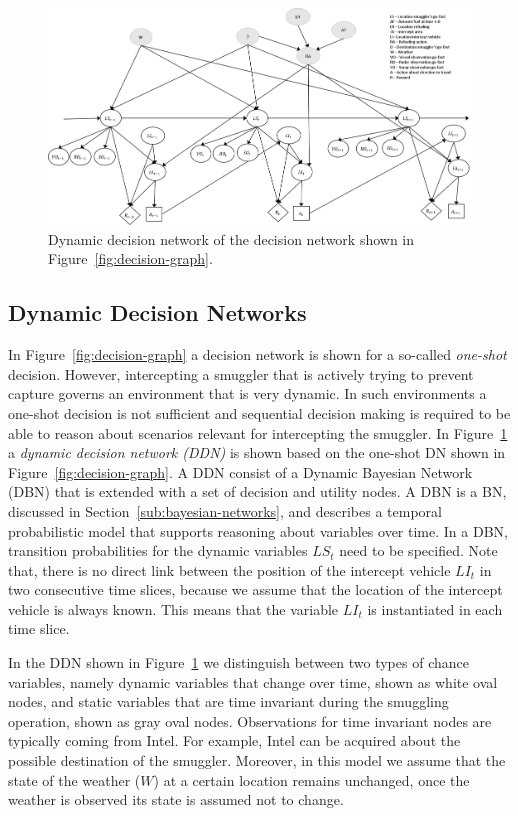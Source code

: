 \documentclass[conference]{IEEEtran}
\begin{document}
\begin{figure}[!t]
\begin{center}
 \includegraphics[width=.95\textwidth]{img/dynamic-decision-graph.png}
 \caption{Dynamic decision network of the decision network shown in Figure~\ref{fig:decision-graph}.}\label{fig:ddn} 
\end{center}
\end{figure}


\subsection{Dynamic Decision Networks}
\label{sub:dyn-dec-net}

In Figure~\ref{fig:decision-graph} a decision network is shown for a so-called \emph{one-shot} decision. However, intercepting a smuggler that is actively trying to prevent capture governs an environment that is very dynamic. In such environments a one-shot decision is not sufficient and sequential decision making is required to be able to reason about scenarios relevant for intercepting the smuggler. In Figure~\ref{fig:ddn} a {\em dynamic decision network (DDN)} is shown based on the one-shot DN shown in Figure~\ref{fig:decision-graph}. A DDN consist of a Dynamic Bayesian Network (DBN) \cite{murphy02phdthesis} that is extended with a set of decision and utility nodes. A DBN is a BN, discussed in Section~\ref{sub:bayesian-networks}, and describes a temporal probabilistic model that supports reasoning about variables over time. In a DBN, transition probabilities for the dynamic variables $LS_t$ need to be specified. Note that, there is no direct link between the position of the intercept vehicle $LI_t$ in two consecutive time slices, because we assume that the location of the intercept vehicle is always known. This means that the variable $LI_t$ is instantiated in each time slice.

In the DDN shown in Figure~\ref{fig:ddn} we distinguish between two types of chance variables, namely dynamic variables that change over time, shown as white oval nodes, and static variables that are time invariant during the smuggling operation, shown as gray oval nodes. Observations for time invariant nodes are typically coming from Intel. For example, Intel can be acquired about the possible destination of the smuggler. Moreover, in this model we assume that the state of the weather ($W$) at a certain location remains unchanged, \ie once the weather is observed its state is assumed not to change.
\end{document}
